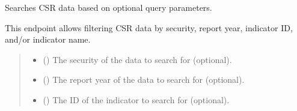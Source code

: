 \documentclass[letterpaper,10pt,english]{sphinxmanual}
\begin{document}
\begin{fulllineitems}
\label{\detokenize{my_fastapi:my_fastapi.main.search_data}}
\pysigstartsignatures
\pysiglinewithargsret
{}
{\sphinxparamcomma {}\sphinxparamcomma {}\sphinxparamcomma {}}
{}
\pysigstopsignatures
\sphinxAtStartPar
Searches CSR data based on optional query parameters.

\sphinxAtStartPar
This endpoint allows filtering CSR data by security, report year, indicator ID, and/or indicator name.
\begin{quote}\begin{description}
\begin{itemize}
\item {} 
\sphinxAtStartPar
{} (\sphinxstyleliteralemphasis{\sphinxupquote{{[}}}\sphinxstyleliteralemphasis{\sphinxupquote{{]}}}) \textendash{} The security of the data to search for (optional).

\item {} 
\sphinxAtStartPar
{} (\sphinxstyleliteralemphasis{\sphinxupquote{{[}}}\sphinxstyleliteralemphasis{\sphinxupquote{{]}}}) \textendash{} The report year of the data to search for (optional).

\item {} 
\sphinxAtStartPar
{} (\sphinxstyleliteralemphasis{\sphinxupquote{{[}}}\sphinxstyleliteralemphasis{\sphinxupquote{{]}}}) \textendash{} The ID of the indicator to search for (optional).


\end{itemize}
\end{description}
\end{quote}
\end{fulllineitems}
\end{document}
